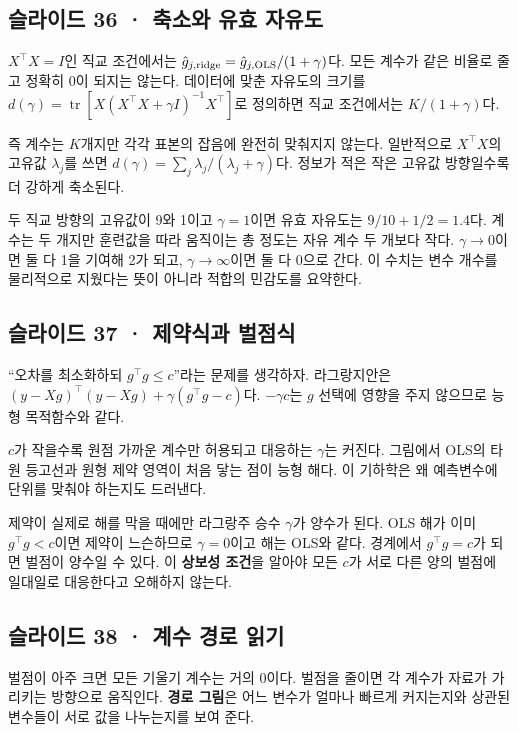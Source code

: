 \documentclass[11pt,a4paper]{article}
\begin{document}
\subsection{슬라이드 36 · 축소와 유효 자유도}
$X^\top X=I$인 직교 조건에서는 $\hat g_{j,\rm ridge}=\hat g_{j,\rm OLS}/(1+\gamma)$다. 모든 계수가 같은 비율로 줄고 정확히 0이 되지는 않는다. 데이터에 맞춘 자유도의 크기를 $d(\gamma)=\operatorname{tr}[X(X^\top X+\gamma I)^{-1}X^\top]$로 정의하면 직교 조건에서는 $K/(1+\gamma)$다.\par

즉 계수는 $K$개지만 각각 표본의 잡음에 완전히 맞춰지지 않는다. 일반적으로 $X^\top X$의 고유값 $\lambda_j$를 쓰면 $d(\gamma)=\sum_j\lambda_j/(\lambda_j+\gamma)$다. 정보가 적은 작은 고유값 방향일수록 더 강하게 축소된다.\par

두 직교 방향의 고유값이 9와 1이고 $\gamma=1$이면 유효 자유도는 $9/10+1/2=1.4$다. 계수는 두 개지만 훈련값을 따라 움직이는 총 정도는 자유 계수 두 개보다 작다. $\gamma\to0$이면 둘 다 1을 기여해 2가 되고, $\gamma\to\infty$이면 둘 다 0으로 간다. 이 수치는 변수 개수를 물리적으로 지웠다는 뜻이 아니라 적합의 민감도를 요약한다.\par

\subsection{슬라이드 37 · 제약식과 벌점식}
“오차를 최소화하되 $g^\top g\le c$”라는 문제를 생각하자. 라그랑지안은 $(y-Xg)^\top(y-Xg)+\gamma(g^\top g-c)$다. $-\gamma c$는 $g$ 선택에 영향을 주지 않으므로 능형 목적함수와 같다.\par

$c$가 작을수록 원점 가까운 계수만 허용되고 대응하는 $\gamma$는 커진다. 그림에서 OLS의 타원 등고선과 원형 제약 영역이 처음 닿는 점이 능형 해다. 이 기하학은 왜 예측변수에 단위를 맞춰야 하는지도 드러낸다.\par

제약이 실제로 해를 막을 때에만 라그랑주 승수 $\gamma$가 양수가 된다. OLS 해가 이미 $g^\top g<c$이면 제약이 느슨하므로 $\gamma=0$이고 해는 OLS와 같다. 경계에서 $g^\top g=c$가 되면 벌점이 양수일 수 있다. 이 \textbf{상보성 조건}을 알아야 모든 $c$가 서로 다른 양의 벌점에 일대일로 대응한다고 오해하지 않는다.\par

\subsection{슬라이드 38 · 계수 경로 읽기}
벌점이 아주 크면 모든 기울기 계수는 거의 0이다. 벌점을 줄이면 각 계수가 자료가 가리키는 방향으로 움직인다. \textbf{경로 그림}은 어느 변수가 얼마나 빠르게 커지는지와 상관된 변수들이 서로 값을 나누는지를 보여 준다.\par
\end{document}
